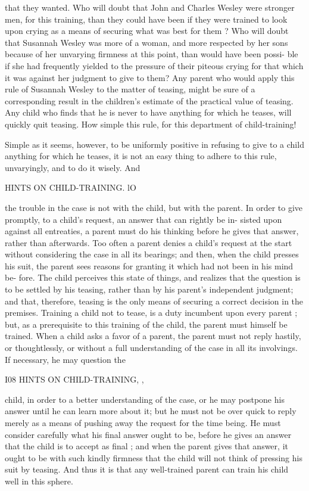 \documentclass[
]{book}
\begin{document}
that they wanted. Who will doubt that John and Charles Wesley were stronger men, for this training, than they could have been if they were trained to look upon crying as a means of securing what was best for them ? Who will doubt that Susannah Wesley was more of a woman, and more respected by her sons because of her unvarying firmness at this point, than would have been possi- ble if she had frequently yielded to the pressure of their piteous crying for that which it was against her judgment to give to them? Any parent who would apply this rule of Susannah Wesley to the matter of teasing, might be sure of a corresponding result in the children's estimate of the practical value of teasing. Any child who finds that he is never to have anything for which he teases, will quickly quit teasing. How simple this rule, for this department of child-training!

Simple as it seems, however, to be uniformly positive in refusing to give to a child anything for which he teases, it is not an easy thing to adhere to this rule, unvaryingly, and to do it wisely. And

HINTS ON CHILD-TRAINING. lO

the trouble in the case is not with the child, but with the parent. In order to give promptly, to a child's request, an answer that can rightly be in- sisted upon against all entreaties, a parent must do his thinking before he gives that answer, rather than afterwards. Too often a parent denies a child's request at the start without considering the case in all its bearings; and then, when the child presses his suit, the parent sees reasons for granting it which had not been in his mind be- fore. The child perceives this state of things, and realizes that the question is to be settled by his teasing, rather than by his parent's independent judgment; and that, therefore, teasing is the only means of securing a correct decision in the premises. Training a child not to tease, is a duty incumbent upon every parent ; but, as a prerequisite to this training of the child, the parent must himself be trained. When a child asks a favor of a parent, the parent must not reply hastily, or thoughtlessly, or without a full understanding of the case in all its involvings. If necessary, he may question the

I08 HINTS ON CHILD-TRAINING, ,

child, in order to a better understanding of the case, or he may postpone his answer until he can learn more about it; but he must not be over quick to reply merely as a means of pushing away the request for the time being. He must consider carefully what his final answer ought to be, before he gives an answer that the child is to accept as final ; and when the parent gives that answer, it ought to be with such kindly firmness that the child will not think of pressing his suit by teasing. And thus it is that any well-trained parent can train his child well in this sphere.
\end{document}
